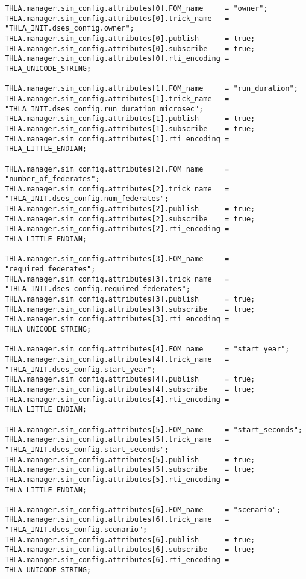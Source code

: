 \begin{lstlisting}[caption={{\tt SIM\_simplesine\_hla\_receiveInt} input file},label={list:complete-receiver-input}]
THLA.manager.sim_config.attributes[0].FOM_name     = "owner";
THLA.manager.sim_config.attributes[0].trick_name   = "THLA_INIT.dses_config.owner";
THLA.manager.sim_config.attributes[0].publish      = true;
THLA.manager.sim_config.attributes[0].subscribe    = true;
THLA.manager.sim_config.attributes[0].rti_encoding = THLA_UNICODE_STRING;

THLA.manager.sim_config.attributes[1].FOM_name     = "run_duration";
THLA.manager.sim_config.attributes[1].trick_name   = "THLA_INIT.dses_config.run_duration_microsec";
THLA.manager.sim_config.attributes[1].publish      = true;
THLA.manager.sim_config.attributes[1].subscribe    = true;
THLA.manager.sim_config.attributes[1].rti_encoding = THLA_LITTLE_ENDIAN;

THLA.manager.sim_config.attributes[2].FOM_name     = "number_of_federates";
THLA.manager.sim_config.attributes[2].trick_name   = "THLA_INIT.dses_config.num_federates";
THLA.manager.sim_config.attributes[2].publish      = true;
THLA.manager.sim_config.attributes[2].subscribe    = true;
THLA.manager.sim_config.attributes[2].rti_encoding = THLA_LITTLE_ENDIAN;

THLA.manager.sim_config.attributes[3].FOM_name     = "required_federates";
THLA.manager.sim_config.attributes[3].trick_name   = "THLA_INIT.dses_config.required_federates";
THLA.manager.sim_config.attributes[3].publish      = true;
THLA.manager.sim_config.attributes[3].subscribe    = true;
THLA.manager.sim_config.attributes[3].rti_encoding = THLA_UNICODE_STRING;

THLA.manager.sim_config.attributes[4].FOM_name     = "start_year";
THLA.manager.sim_config.attributes[4].trick_name   = "THLA_INIT.dses_config.start_year";
THLA.manager.sim_config.attributes[4].publish      = true;
THLA.manager.sim_config.attributes[4].subscribe    = true;
THLA.manager.sim_config.attributes[4].rti_encoding = THLA_LITTLE_ENDIAN;

THLA.manager.sim_config.attributes[5].FOM_name     = "start_seconds";
THLA.manager.sim_config.attributes[5].trick_name   = "THLA_INIT.dses_config.start_seconds";
THLA.manager.sim_config.attributes[5].publish      = true;
THLA.manager.sim_config.attributes[5].subscribe    = true;
THLA.manager.sim_config.attributes[5].rti_encoding = THLA_LITTLE_ENDIAN;

THLA.manager.sim_config.attributes[6].FOM_name     = "scenario";
THLA.manager.sim_config.attributes[6].trick_name   = "THLA_INIT.dses_config.scenario";
THLA.manager.sim_config.attributes[6].publish      = true;
THLA.manager.sim_config.attributes[6].subscribe    = true;
THLA.manager.sim_config.attributes[6].rti_encoding = THLA_UNICODE_STRING;


\end{lstlisting}
